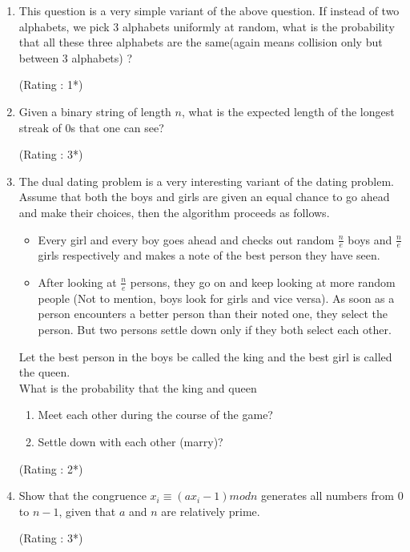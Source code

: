 \documentclass[paper=a4, fontsize=11pt]{scrartcl} %
\numberwithin{equation}{section} %
\numberwithin{figure}{section} %
\numberwithin{table}{section} %
\begin{document}
\begin{enumerate}
\item This question is a very simple variant of the above question. If instead of two alphabets, we pick 3 alphabets uniformly at random, what is the probability that all these three alphabets are the same(again means collision only but between 3 alphabets) ?
\begin{flushright}
\small{(Rating : 1*)}
\end{flushright}
\vspace{0.2cm}

\item Given a binary string of length $n$, what is the expected length of the longest streak of $0$s that one can see? 
\begin{flushright}
\small{(Rating : 3*)}
\end{flushright}
\vspace{0.2cm}

\item The dual dating problem is a very interesting variant of the dating problem. Assume that both the boys and girls are given an equal chance to go ahead and make their choices, then the algorithm proceeds as follows.
\begin{itemize}
\item Every girl and every boy goes ahead and checks out random $\frac{n}{e}$ boys and $\frac{n}{e}$ girls respectively and makes a note of the best person they have seen.
\item After looking at $\frac{n}{e}$ persons, they go on and keep looking at more random people (Not to mention, boys look for girls and vice versa). As soon as a person encounters a better person than their noted one, they select the person. But two persons settle down only if they both select each other. 
\end{itemize}
Let the best person in the boys be called the king and the best girl is called the queen.\\
What is the probability that the king and queen 
\begin{enumerate}
\item Meet each other during the course of the game?
\item Settle down with each other (marry)?
\end{enumerate}
\begin{flushright}
\small{(Rating : 2*)}
\end{flushright}
\vspace{0.2cm}

\item Show that the congruence $x_i \equiv (a x_i - 1 )mod n$ generates all numbers from $0$ to $n-1$, given that $a$ and $n$ are relatively prime. 
\begin{flushright}
\small{(Rating : 3*)}
\end{flushright}
\vspace{0.2cm}


\end{enumerate}
\end{document}
